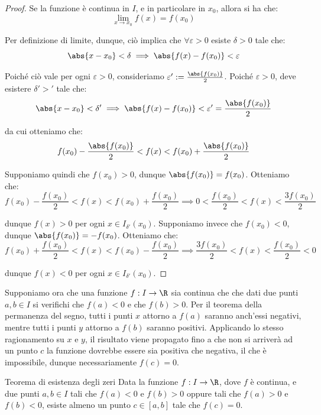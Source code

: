\documentclass[a4paper, 12pt]{report}
\begin{document}
    \begin{proof}
        Se la funzione è continua in $I$, e in particolare in $x_0$, allora si ha che:
        \[\lim_{x \to x_0} f(x) = f(x_0)\]

        Per definizione di limite, dunque, ciò implica che $\forall \varepsilon > 0$ esiste $\delta > 0$ tale che:
        \[\abs{x-x_0} < \delta \implies \abs{f(x) - f(x_0)} < \varepsilon\]

        Poiché ciò vale per ogni $\varepsilon > 0$, consideriamo $\varepsilon' := \frac{\abs{f(x_0)}}{2}$. Poiché $\varepsilon > 0$, deve esistere $\delta' > '$ tale che:
        \[\abs{x-x_0} < \delta' \implies \abs{f(x) - f(x_0)} < \varepsilon' = \frac{\abs{f(x_0)}}{2}\]

        da cui otteniamo che:
        \[f(x_0) - \frac{\abs{f(x_0)}}{2} < f(x) < f(x_0) + \frac{\abs{f(x_0)}}{2}\]

        Supponiamo quindi che $f(x_0) > 0$, dunque $\abs{f(x_0)} = f(x_0)$. Otteniamo che:
        \[f(x_0) - \frac{f(x_0)}{2} < f(x) < f(x_0) + \frac{f(x_0)}{2} \implies 0 < \frac{f(x_0)}{2} < f(x) < \frac{3 f(x_0)}{2} \]

        dunque $f(x) > 0$ per ogni $x \in I_{\delta'}(x_0)$. Supponiamo invece che $f(x_0) < 0$, dunque $\abs{f(x_0)} = -f(x_0)$. Otteniamo che:
        \[f(x_0) + \frac{f(x_0)}{2} < f(x) < f(x_0) - \frac{f(x_0)}{2} \implies \frac{3f(x_0)}{2} < f(x) < \frac{f(x_0)}{2} < 0 \]

        dunque $f(x) < 0$ per ogni $x \in I_{\delta'}(x_0)$.
    \end{proof}

    Supponiamo ora che una funzione $f : I \to \R$ sia continua che che dati due punti $a,b \in I$ si verifichi che $f(a) < 0$ e che $f(b) > 0$. Per il teorema della permanenza del segno, tutti i punti $x$ attorno a  $f(a)$ saranno anch'essi negativi, mentre tutti i punti $y$ attorno a $f(b)$ saranno positivi. Applicando lo stesso ragionamento su $x$ e  $y$, il risultato viene propagato fino a che non si arriverà ad un punto $c$ la funzione dovrebbe essere sia positiva che negativa, il che è impossibile, dunque necessariamente $f(c) = 0$.

    \begin{framedthm}{Teorema di esistenza degli zeri}
        Data la funzione $f : I \to \R$, dove $f$ è continua, e due punti $a,b \in I$ tali che $f(a) < 0$ e $f(b) > 0$ oppure tali che $f(a) > 0$ e $f(b) < 0$, esiste almeno un punto $c \in [a,b]$ tale che $f(c) = 0$. 
    \end{framedthm}
\end{document}
